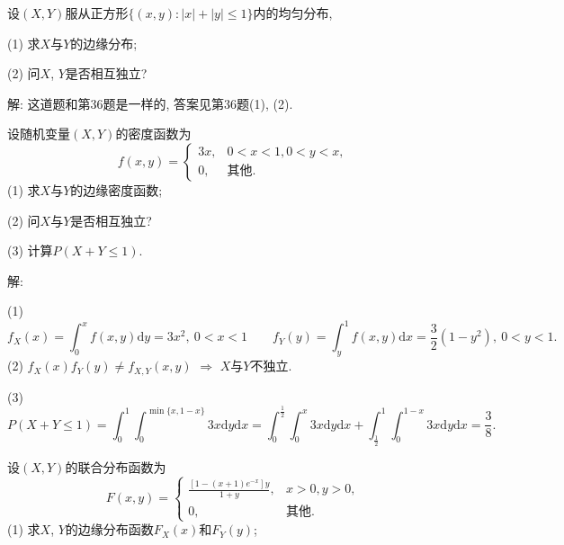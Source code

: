 \documentclass[standard]{ExBook}
\renewenvironment{shaded}{%
  \def\FrameCommand{\fboxsep=\FrameSep \colorbox{shadecolor}}%
  \MakeFramed{\advance\hsize-\width \FrameRestore}%
}{%
  \endMakeFramed
}
\begin{document}
\begin{qitems}
\vspace{2.5cm-5em}

    \begin{bbox}
    \begin{shaded}
        \qitem
设$(X,Y)$服从正方形$\{(x,y):|x|+|y|\leq 1\}$内的均匀分布,

(1) 求$X$与$Y$的边缘分布;

(2) 问$X$, $Y$是否相互独立?
    \end{shaded}
    \end{bbox}

\vspace{\dimexpr2.5cm-5em\relax}

解: 这道题和第36题是一样的, 答案见第36题(1), (2).

\vspace{2.5cm-5em}

    \begin{bbox}
    \begin{shaded}
        \qitem
设随机变量$(X,Y)$的密度函数为
$$
    f(x,y)=
    \left\{
    \begin{array}{ll}
        3x, &0<x<1,0<y<x,\\
        0, & \text{其他}.
    \end{array}
    \right.
$$
(1) 求$X$与$Y$的边缘密度函数;

(2) 问$X$与$Y$是否相互独立?

(3) 计算$P(X+Y\leq 1)$.
    \end{shaded}
    \end{bbox}

\vspace{\dimexpr2.5cm-5em\relax}

解: 

(1)
$$f_{X}(x)=\int_{0}^{x}f(x,y)\mathrm{d}y=3x^2,\ 0<x<1\qquad f_{Y}(y)=\int_{y}^{1}f(x,y)\mathrm{d}x=\frac{3}{2}(1-y^2),\ 0<y<1.$$
(2) $f_{X}(x)f_{Y}(y)\neq f_{X,Y}(x,y)$ $\Longrightarrow$ $X$与$Y$不独立.

(3)
$$P(X+Y\leq1)=\int_{0}^{1}\int_{0}^{\min\{x,1-x\}}3x\mathrm{d}y\mathrm{d}x=\int_{0}^{\frac{1}{2}}\int_{0}^{x}3x\mathrm{d}y\mathrm{d}x+\int_{\frac{1}{2}}^{1}\int_{0}^{1-x}3x\mathrm{d}y\mathrm{d}x=\frac{3}{8}.$$

\vspace{2.5cm-5em}

    \begin{bbox}
    \begin{shaded}
        \qitem
设$(X,Y)$的联合分布函数为
$$
    F(x,y)=
    \left\{
    \begin{array}{ll}
        \displaystyle\frac{\left[1-(x+1)e^{-x}\right]y}{1+y}, & x>0, y>0,\\
        0, & \text{其他}.
    \end{array}
    \right.
$$
(1) 求$X$, $Y$的边缘分布函数$F_{X}(x)$和$F_{Y}(y)$;


\end{shaded}
\end{bbox}
\end{qitems}
\end{document}
